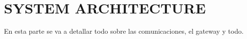 \section{SYSTEM ARCHITECTURE}
En esta parte se va a detallar todo sobre las comunicaciones, el gateway y todo.
